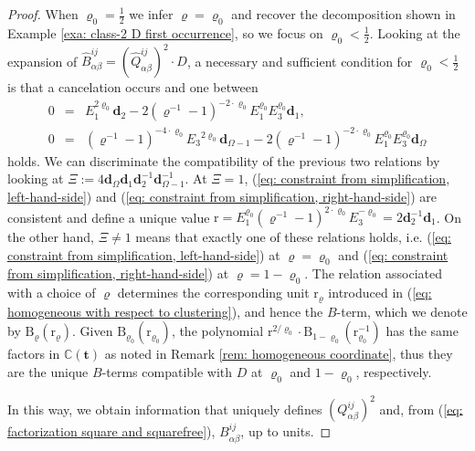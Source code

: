 \documentclass[10pt]{article}
\theoremstyle{remark}%
\theoremstyle{definition}%
\begin{document}
\begin{proof}
When $\varrho_{0}=\frac{1}{2}$ we infer $\varrho=\varrho_{0}$ and recover the decomposition shown in Example \ref{exa: class-2 D first occurrence}, so we focus on $\varrho_{0}<\frac{1}{2}$. Looking at the expansion of $\hat{B}_{\alpha\beta}^{ij}=(\hat{Q}_{\alpha\beta}^{ij})^{2}\cdot D$, a necessary and sufficient condition for $\varrho_{0}<\frac{1}{2}$ is that a cancelation occurs and one between 
\begin{eqnarray} 
0 & = & E_{1}^{2\varrho_{0}}\mathbf{d}_{2}-2\left(\varrho^{-1}-1\right)^{-2\cdot\varrho_{0}}E_{1}^{\varrho_{0}}E_{3}^{\varrho_{0}}\mathbf{d}_{1}, 
\label{eq: constraint from simplification, left-hand-side}\\
0 & = & \left(\varrho^{-1}-1\right)^{-4\cdot\varrho_{0}}E_{3}{}^{2\varrho_{0}}\mathbf{d}_{\Omega-1}-2\left(\varrho^{-1}-1\right)^{-2\cdot\varrho_{0}}E_{1}^{\varrho_{0}}E_{3}^{\varrho_{0}}\mathbf{d}_{\Omega}
\label{eq: constraint from simplification, right-hand-side} 
\end{eqnarray}
holds. We can discriminate the compatibility of the previous two relations by looking at $\Xi:=4\mathbf{d}_{\Omega}\mathbf{d}_{1}\mathbf{d}_{2}^{-1}\mathbf{d}_{\Omega-1}^{-1}$. At $\Xi=1$, (\ref{eq: constraint from simplification, left-hand-side}) and (\ref{eq: constraint from simplification, right-hand-side}) are consistent and define a unique value $\mathrm{r}=E_{1}^{\varrho_{0}}(\varrho^{-1}-1)^{2\cdot\varrho_{0}}E_{3}^{-\varrho_{0}}=2\mathbf{d}_{2}^{-1}\mathbf{d}_{1}$. 
On the other hand, $\Xi\neq1$ means that exactly one of these relations holds, i.e. (\ref{eq: constraint from simplification, left-hand-side}) at $\varrho=\varrho_{0}$ and (\ref{eq: constraint from simplification, right-hand-side}) at $\varrho=1-\varrho_{0}$. The relation associated with a choice of $\varrho$ determines the corresponding unit $\mathrm{r}_{\varrho}$ introduced in (\ref{eq: homogeneous with respect to clustering}), and hence the $B$-term, which we denote by $\mathrm{B}_{\varrho}(\mathrm{r}_{\varrho})$. Given $\mathrm{B}_{\varrho_{0}}(\mathrm{r}_{\varrho_{0}})$, the polynomial $\mathrm{r}^{2/\varrho_{0}}\cdot\mathrm{B}_{1-\varrho_{0}}(\mathrm{r}_{\varrho_{0}}^{-1})$ has the same factors in $\mathbb{C}(\mathbf{t})$ as noted in Remark \ref{rem: homogeneous coordinate}, thus they are the unique $B$-terms compatible with $D$ at $\varrho_{0}$ and $1-\varrho_{0}$, respectively. 

In this way, we obtain information that uniquely defines $(Q_{\alpha\beta}^{ij})^{2}$ and, from (\ref{eq: factorization square and squarefree}), $B_{\alpha\beta}^{ij}$, up to units. 
\end{proof}
\end{document}
